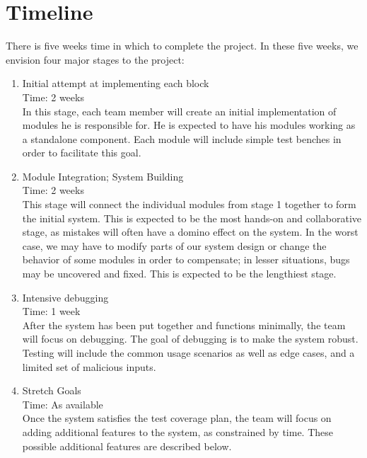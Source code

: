\documentclass{article}
\begin{document}
\section{Timeline}
There is five weeks time in which to complete the project. In these five weeks, we envision four major stages to the project: 
\begin{enumerate}
	\item Initial attempt at implementing each block \hfill \\
		Time: 2 weeks \hfill \\
		In this stage, each team member will create an initial implementation of modules he is responsible for. He is expected to have his modules working as a standalone component. Each module will include simple test benches in order to facilitate this goal. 
	\item Module Integration; System Building \hfill \\
		Time: 2 weeks \hfill \\
		This stage will connect the individual modules from stage 1 together to form the initial system. This is expected to be the most hands-on and collaborative stage, as mistakes will often have a domino effect on the system. In the worst case, we may have to modify parts of our system design or change the behavior of some modules in order to compensate; in lesser situations, bugs may be uncovered and fixed. This is expected to be the lengthiest stage. 
	\item Intensive debugging \hfill \\
		Time: 1 week \hfill \\
		After the system has been put together and functions minimally, the team will focus on debugging. The goal of debugging is to make the system robust. Testing will include the common usage scenarios as well as edge cases, and a limited set of malicious inputs. 
	\item Stretch Goals \hfill \\ 
		Time: As available \hfill \\
		Once the system satisfies the test coverage plan, the team will focus on adding additional features to the system, as constrained by time. These possible additional features are described below.

\end{enumerate}
\end{document}
